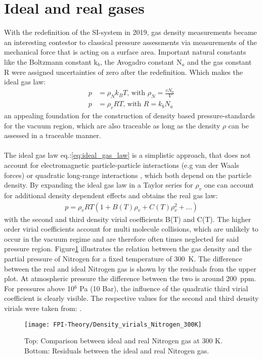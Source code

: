 \section{Ideal and real gases}
With the redefinition of the SI-system in 2019, gas density measurements became an interesting contestor to classical pressure assessments via measurements of the mechanical force that is acting on a surface area.  Important natural constants like the Boltzmann constant k$_b$, the Avogadro constant N$_a$ and the gas constant R were assigned uncertainties of zero after the redefinition. Which makes the ideal gas law:
\begin{align}
	p&=\rho_N k_B T \text{, with  } \rho_N=\frac{vN_a}{V} \nonumber\\
	p&=\rho_v R T \text{, with  } R=k_bN_a
	\label{eq:ideal_gas_law}
\end{align}
an appealing foundation for the construction of density based pressure-standards for the vacuum region, which are also traceable as long as the density $\rho$ can be assessed in a traceable manner.\\\\
\noindent
The ideal gas law eq.:\ref{eq:ideal_gas_law} is a simplistic approach, that does not account for electromagnetic particle-particle interactions (e.g van der Waals forces) or quadratic long-range interactions \cite{Jousten-2017}, which both depend on the particle density. By expanding the ideal gas law in a Taylor series for $\rho_v$ one can account for additional density dependent effects and obtains the real gas law:
\begin{align}
	p=\rho_v R T (1+ B(T) \rho_v + C(T)\rho_v^2 + ...)
	\label{eq:real_gas_law}
\end{align}
with the second and third density virial coefficients B(T) and C(T). The higher order virial coefficients account for multi molecule collisions, which are unlikely to occur in the vacuum regime and are therefore often times neglected for said pressure region. Figure\ref{figure:density_virials} illustrates the relation between the gas density and the partial pressure of Nitrogen for a fixed temperature of \mbox{300 K}. The difference between the real and ideal Nitrogen gas is shown by the residuals from the upper plot. At atmospheric pressure the difference between the two is around \mbox{200 ppm}. For pressures above 10$^6$ Pa (10 Bar), the influence of the quadratic third virial coefficient is clearly visible. The respective values for the second and third density virials were taken from: \cite{Sevast-1986}.
\begin{figure}[ht]
	\centering
	\texttt{[image: FPI-Theory/Density\_virials\_Nitrogen\_300K]}
	\caption{Top: Comparison between ideal and real Nitrogen gas at 300 K.\\
				Bottom:  Residuals between the ideal and real Nitrogen gas.}
	\label{figure:density_virials}
\end{figure}
\newpage
